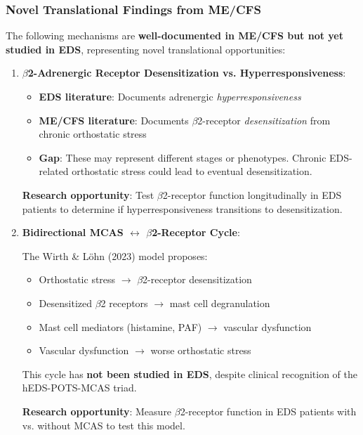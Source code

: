 \subsubsection{Novel Translational Findings from ME/CFS}

The following mechanisms are \textbf{well-documented in ME/CFS but not yet studied in EDS}, representing novel translational opportunities:

\begin{enumerate}
    \item \textbf{$\beta$2-Adrenergic Receptor Desensitization vs. Hyperresponsiveness}:

    \begin{itemize}
        \item \textbf{EDS literature}: Documents adrenergic \textit{hyperresponsiveness}
        \item \textbf{ME/CFS literature}: Documents $\beta$2-receptor \textit{desensitization} from chronic orthostatic stress~\cite{Wirth2023}
        \item \textbf{Gap}: These may represent different stages or phenotypes. Chronic EDS-related orthostatic stress could lead to eventual desensitization.
    \end{itemize}

    \textbf{Research opportunity}: Test $\beta$2-receptor function longitudinally in EDS patients to determine if hyperresponsiveness transitions to desensitization.

    \item \textbf{Bidirectional MCAS $\leftrightarrow$ $\beta$2-Receptor Cycle}:

    The Wirth \& Löhn (2023) model proposes:
    \begin{itemize}
        \item Orthostatic stress $\rightarrow$ $\beta$2-receptor desensitization
        \item Desensitized $\beta$2 receptors $\rightarrow$ mast cell degranulation
        \item Mast cell mediators (histamine, PAF) $\rightarrow$ vascular dysfunction
        \item Vascular dysfunction $\rightarrow$ worse orthostatic stress
    \end{itemize}

    This cycle has \textbf{not been studied in EDS}, despite clinical recognition of the hEDS-POTS-MCAS triad.

    \textbf{Research opportunity}: Measure $\beta$2-receptor function in EDS patients with vs. without MCAS to test this model.


\end{enumerate}
